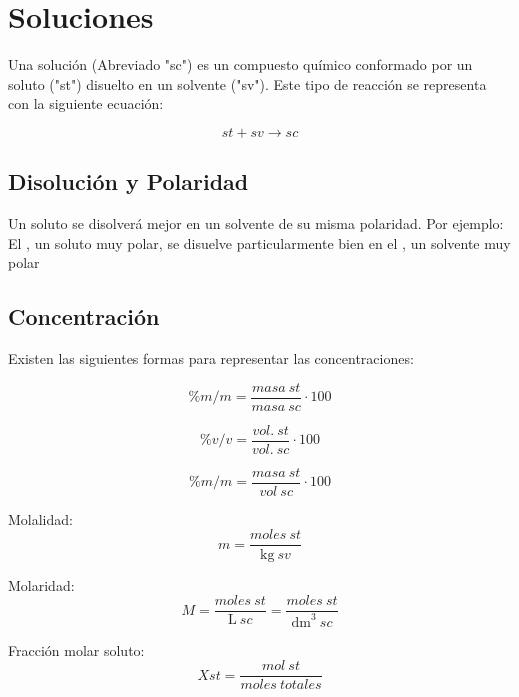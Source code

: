 \documentclass[../Teoría.root.tex]{subfiles}
\begin{document}
\section{Soluciones}
Una solución (Abreviado "sc") es un compuesto químico conformado por un soluto ("st") disuelto en un solvente ("sv"). Este tipo de reacción se representa con la siguiente ecuación:

\begin{equation}
    st + sv \rightarrow sc
\end{equation}

\subsection{Disolución y Polaridad}
Un soluto se disolverá mejor en un solvente de su misma polaridad. Por ejemplo: El , un soluto muy polar, se disuelve particularmente bien en el , un solvente muy polar

\subsection{Concentración}
Existen las siguientes formas para representar las concentraciones:

\begin{equation} \label{eq:concentracion.m/m}
    \%m / m = \frac{masa\ st}{masa\ sc} \cdot 100
\end{equation}

\begin{equation} \label{eq:concentracion.v/v}
    \%v / v = \frac{vol.\ st}{vol.\ sc} \cdot 100
\end{equation}

\begin{equation} \label{eq:concentracion.m/v}
    \%m / m = \frac{masa\ st}{vol\ sc} \cdot 100
\end{equation}

Molalidad:
\begin{equation} \label{eq:concentracion.molalidad}
    m = \frac{moles\ st}{\si{\kg}\ sv} 
\end{equation}

Molaridad:
\begin{equation} \label{eq:concentracion.molaridad}
    M = \frac{moles\ st}{\si{\L}\ sc} = \frac{moles\ st}{\si{\dm\cubed}\ sc}
\end{equation}

Fracción molar soluto:
\begin{equation} \label{eq:concentracion.frac soluto}
    Xst = \frac{mol\ st}{moles\ totales}
\end{equation}
\end{document}

